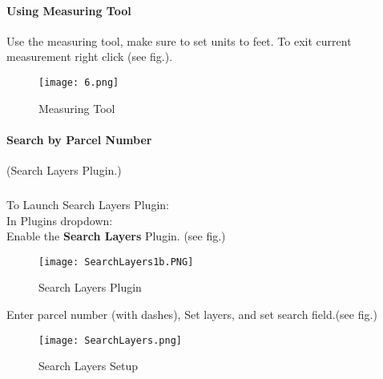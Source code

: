 \documentclass[class=book , crop=false]{standalone}
\begin{document}
\clearpage
		\paragraph{Using Measuring Tool}
			\large Use the measuring tool, make sure to set units to feet.  To exit current measurement right click (see fig.).
				\begin{figure}[H]
				\begin{center}
				\texttt{[image: 6.png]}
				\end{center}
				\caption{Measuring Tool}
				\end{figure}	
						
\clearpage			
		\paragraph{Search by Parcel Number}
			\small (Search Layers Plugin.)
			\subparagraph{}
				To Launch Search Layers Plugin:\\In Plugins dropdown:\\Enable the \textbf{Search Layers} Plugin. (see fig.)		
				\begin{figure}[H]
				\begin{center}
				\texttt{[image: SearchLayers1b.PNG]}
				\end{center}
				\caption{Search Layers Plugin}
				\end{figure}
			\bigskip
				Enter parcel number {\tiny (with dashes)}, Set layers, and set search field.(see fig.) 
				\begin{figure}[H]						
				\begin{center}
				\texttt{[image: SearchLayers.png]}
				\end{center}
				\caption{Search Layers Setup}
				\end{figure}
				
							
\clearpage			
			
\end{document}

